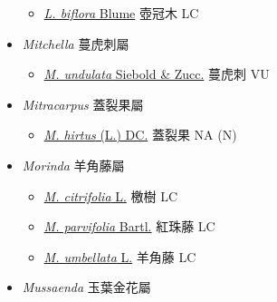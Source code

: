 \begin{itemize}
  \begin{itemize}
        \item[] \href{http://www.theplantlist.org/tpl1.1/search?q=Litosanthes+biflora}{\textit{L. biflora} Blume}   壺冠木   LC
  \end{itemize}
 \item[] \textit{Mitchella} 蔓虎刺屬
                                
  \begin{itemize}
        \item[] \href{http://www.theplantlist.org/tpl1.1/search?q=Mitchella+undulata}{\textit{M. undulata} Siebold \& Zucc.}   蔓虎刺   VU
  \end{itemize}
 \item[] \textit{Mitracarpus} 蓋裂果屬
                                
  \begin{itemize}
        \item[] \href{http://www.theplantlist.org/tpl1.1/search?q=Mitracarpus+hirtus}{\textit{M. hirtus} (L.) DC.}   蓋裂果   NA (N)
  \end{itemize}
 \item[] \textit{Morinda} 羊角藤屬
                                
  \begin{itemize}
        \item[] \href{http://www.theplantlist.org/tpl1.1/search?q=Morinda+citrifolia}{\textit{M. citrifolia} L.}   檄樹   LC
        \item[] \href{http://www.theplantlist.org/tpl1.1/search?q=Morinda+parvifolia}{\textit{M. parvifolia} Bartl.}   紅珠藤   LC
        \item[] \href{http://www.theplantlist.org/tpl1.1/search?q=Morinda+umbellata}{\textit{M. umbellata} L.}   羊角藤   LC
  \end{itemize}
 \item[] \textit{Mussaenda} 玉葉金花屬
                                

\end{itemize}
